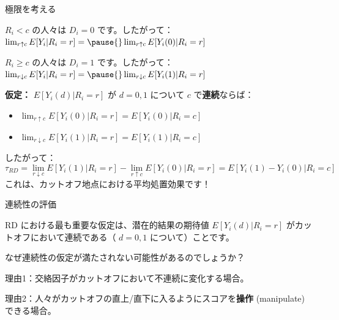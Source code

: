\documentclass[11pt,handout]{beamer}
\newenvironment{wideitemize}{\itemize\addtolength{\itemsep}{10pt}}{\enditemize}
\newenvironment{wideitemizeshort}{\itemize}{\enditemize}
\begin{document}
\begin{frame}{極限を考える}
\begin{wideitemizeshort}
	\item
	$R_i < c$ の人々は $D_i = 0$ です。したがって：
	$\lim_{r \uparrow c} E[Y_{i} | R_i = r] = \pause{}  \lim_{r \uparrow c} E[Y_{i}(0) | R_i = r]$
	
	\pause
	\item 
	$R_i \geq c$ の人々は $D_i = 1$ です。したがって：
	$\lim_{r \downarrow c} E[Y_{i} | R_i = r] = \pause{} \lim_{r \downarrow c} E[Y_{i}(1) | R_i = r]$
	
	\pause
	\item
	\textbf{仮定：} $E[Y_{i}(d) | R_i = r]$ が $d= 0,1$ について $c$ で\textbf{連続}ならば：
	\smallskip\pause{}
	\begin{itemize}
	\item $\lim_{r \uparrow c} E[Y_{i}(0) | R_i = r]=E[Y_{i}(0) | R_i = c]$\smallskip\pause{}
	\item $\lim_{r \downarrow c} E[Y_{i}(1) | R_i = r]=E[Y_{i}(1) | R_i = c]$
	\end{itemize}
	\pause
	\item
	したがって：
	{\small $$\tau_{RD} =\lim_{r \downarrow c} E[Y_{i}(1) | R_i = r]- \lim_{r \uparrow c} E[Y_{i}(0) | R_i = r] = E [Y_{i}(1) - Y_{i}(0) | R_i = c] $$}
	\pause これは、カットオフ地点における平均処置効果です！
\end{wideitemizeshort}

\end{frame} 


\begin{frame}{連続性の評価}
	\begin{wideitemize}
		\item
		RD における最も重要な仮定は、潜在的結果の期待値 $E[Y_i(d) | R_i = r]$ がカットオフにおいて連続である（ $d=0,1$ について）ことです。
		
		\pause
		\item
		なぜ連続性の仮定が満たされない可能性があるのでしょうか？
		
		\pause
		\item
		理由1：交絡因子がカットオフにおいて不連続に変化する場合。
		
		\pause
		\item
		理由2：人々がカットオフの直上/直下に入るようにスコアを\textbf{操作} (manipulate) できる場合。
		
	\end{wideitemize}
\end{frame}	
\end{document}
